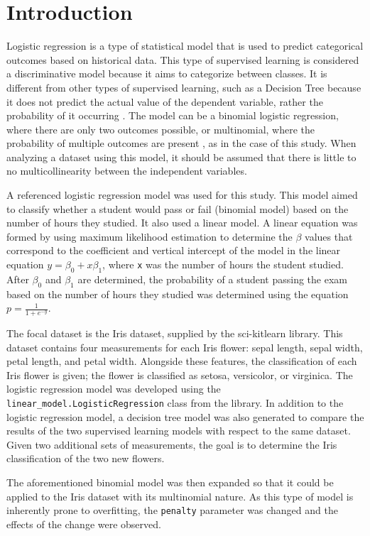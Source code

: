 \documentclass[journal]{IEEEtran}
\begin{document}
\section{Introduction}
Logistic regression is a type of statistical model that is used to predict categorical outcomes based on historical data. This type of supervised learning is considered a discriminative model because it aims to categorize between classes. It is different from other types of supervised learning, such as a Decision Tree because it does not predict the actual value of the dependent variable, rather the probability of it occurring \cite{b1}. The model can be a binomial logistic regression, where there are only two outcomes possible, or multinomial, where the probability of multiple outcomes are present \cite{b2}, as in the case of this study. When analyzing a dataset using this model, it should be assumed that there is little to no multicollinearity between the independent variables.

A referenced logistic regression model \cite{b3} was used for this study. This model aimed to classify whether a student would pass or fail (binomial model) based on the number of hours they studied. It also used a linear model. A linear equation was formed by using maximum likelihood estimation \cite{b1} to determine the $\beta$ values that correspond to the coefficient and vertical intercept of the model in the linear equation \( y = \beta_0 + x\beta_1\), where \lstinline{x} was the number of hours the student studied. After $\beta_0$ and $\beta_1$ are determined, the probability of a student passing the exam based on the number of hours they studied was determined using the equation \(p=\frac{1}{1+e^{-y}}\). 

The focal dataset is the Iris dataset, supplied by the sci-kitlearn library. This dataset contains four measurements for each Iris flower: sepal length, sepal width, petal length, and petal width. Alongside these features, the classification of each Iris flower is given; the flower is classified as setosa, versicolor, or virginica. The logistic regression model was developed using the \lstinline{linear_model.LogisticRegression} class from the library. In addition to the logistic regression model, a decision tree model was also generated to compare the results of the two supervised learning models with respect to the same dataset. Given two additional sets of measurements, the goal is to determine the Iris classification of the two new flowers.

The aforementioned binomial model was then expanded so that it could be applied to the Iris dataset with its multinomial nature. As this type of model is inherently prone to overfitting, the \lstinline{penalty} parameter was changed and the effects of the change were observed. 
\end{document}
